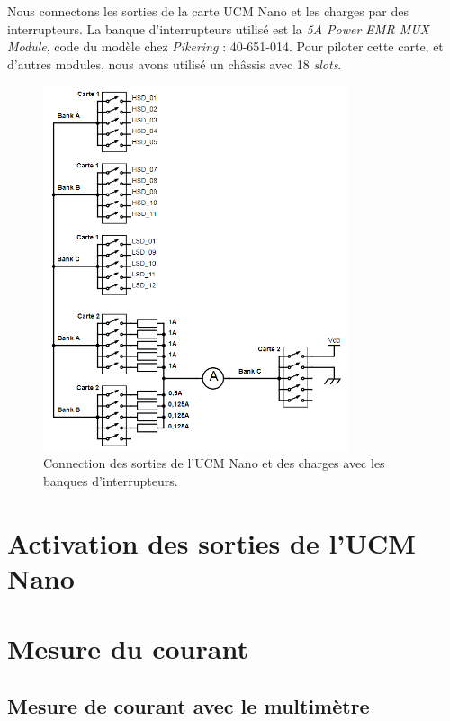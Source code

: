 Nous connectons les sorties de la carte UCM Nano et les charges par des interrupteurs. La banque d'interrupteurs utilisé est la \textit{5A Power EMR MUX Module}, code du modèle chez \emph{Pikering} : 40-651-014. Pour piloter cette carte, et d'autres modules, nous avons utilisé un châssis avec 18 \textit{slots}.


\begin{figure}[H]
    \centering
    \includegraphics[width=0.80\textwidth]{images/switches-carte1-2}
    \caption{Connection des sorties de l'UCM Nano et des charges avec les banques d'interrupteurs.}
    \label{fig:switches-carte1-2}
\end{figure}


\section{Activation des sorties de l'UCM Nano}


\section{Mesure du courant}

\subsection{Mesure de courant avec le multimètre}



